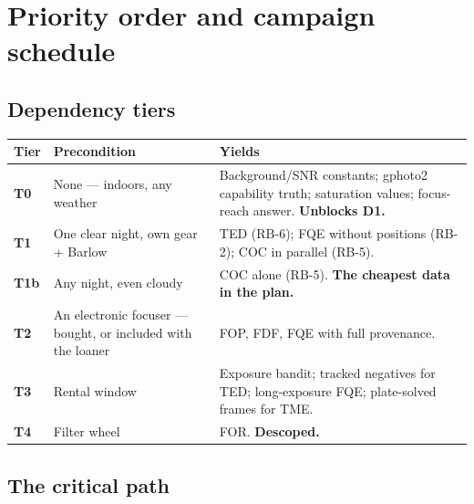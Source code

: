 \documentclass[11pt]{article}
\begin{document}
\section{Priority order and campaign schedule}

\subsection{Dependency tiers}

\begin{center}
\scriptsize
\begin{tabular}{@{}lp{}p{}@{}}
\toprule
\textbf{Tier} & \textbf{Precondition} & \textbf{Yields} \\
\midrule
\textbf{T0} & None --- indoors, any weather & Background/SNR constants; gphoto2 capability truth; saturation values; focus-reach answer. \textbf{Unblocks D1.} \\
\textbf{T1} & One clear night, own gear + Barlow & TED (RB-6); FQE without positions (RB-2); COC in parallel (RB-5). \\
\textbf{T1b} & Any night, even cloudy & COC alone (RB-5). \textbf{The cheapest data in the plan.} \\
\textbf{T2} & An electronic focuser --- bought, or included with the loaner & FOP, FDF, FQE with full provenance. \\
\textbf{T3} & Rental window & Exposure bandit; tracked negatives for TED; long-exposure FQE; plate-solved frames for TME. \\
\textbf{T4} & Filter wheel & FOR. \textbf{Descoped.} \\
\bottomrule
\end{tabular}
\end{center}

\subsection{The critical path}\label{sec:critical}
\end{document}
